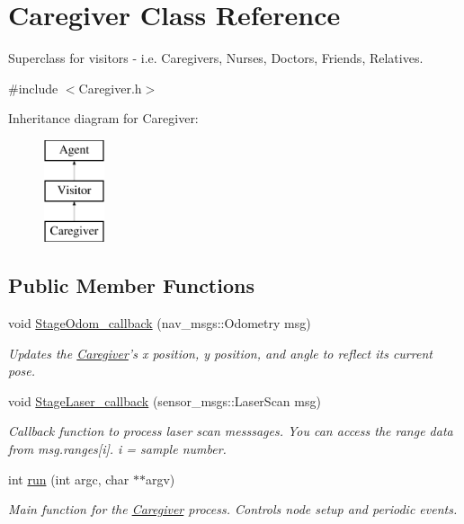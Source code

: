 \hypertarget{classCaregiver}{\section{Caregiver Class Reference}
\label{classCaregiver}
}


Superclass for visitors -\/ i.\-e. Caregivers, Nurses, Doctors, Friends, Relatives.  




{\ttfamily \#include $<$Caregiver.\-h$>$}

Inheritance diagram for Caregiver\-:\begin{figure}[H]
\begin{center}
\leavevmode
\includegraphics[height=3.000000cm]{classCaregiver}
\end{center}
\end{figure}
\subsection*{Public Member Functions}
\begin{DoxyCompactItemize}
\item 
void \hyperlink{classCaregiver_aa326466c62614b84d6a750dc0e59fa48}{Stage\-Odom\-\_\-callback} (nav\-\_\-msgs\-::\-Odometry msg)
\begin{DoxyCompactList}\small\item\em Updates the \hyperlink{classCaregiver}{Caregiver}'s x position, y position, and angle to reflect its current pose. \end{DoxyCompactList}\item 
void \hyperlink{classCaregiver_a3dc0edd8065745e6f355f80f2b293ba1}{Stage\-Laser\-\_\-callback} (sensor\-\_\-msgs\-::\-Laser\-Scan msg)
\begin{DoxyCompactList}\small\item\em Callback function to process laser scan messsages. You can access the range data from msg.\-ranges\mbox{[}i\mbox{]}. i = sample number. \end{DoxyCompactList}\item 
\hypertarget{classCaregiver_a940203c96d2be4d4de57baee6bbf1a62}{int \hyperlink{classCaregiver_a940203c96d2be4d4de57baee6bbf1a62}{run} (int argc, char $\ast$$\ast$argv)}\label{classCaregiver_a940203c96d2be4d4de57baee6bbf1a62}

\begin{DoxyCompactList}\small\item\em Main function for the \hyperlink{classCaregiver}{Caregiver} process. Controls node setup and periodic events. \end{DoxyCompactList}\end{DoxyCompactItemize}
